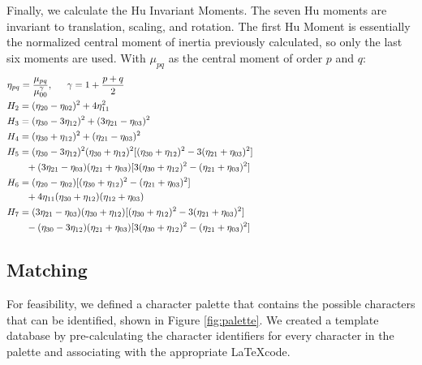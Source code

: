 \documentclass[journal]{IEEEtran}
\begin{document}
Finally, we calculate the Hu Invariant Moments\cite{Muralidharan:article_typical}. The seven Hu moments are invariant to translation, scaling, and rotation\cite{Hu:article_typical}. The first Hu Moment is essentially the normalized central moment of inertia previously calculated, so only the last six moments are used. With $\mu_{pq}$ as the central moment of order $p$ and $q$:
    \begin{equation} \label{eq:hu_moments}
    \begin{aligned}
    &\eta_{pq}=\frac{\mu_{pq}}{\mu_{00}^{\gamma}}, \hspace{15pt} \gamma=1+\frac{p+q}{2}\\
    & H_2=(\eta_{20}-\eta_{02})^2 +4\eta_{11}^2 \\    
    & H_3=(\eta_{30}-3\eta_{12})^2 +(3\eta_{21}-\eta_{03})^2 \\
    & H_4=(\eta_{30}+\eta_{12})^2 +(\eta_{21}-\eta_{03})^2 \\
    & H_5=(\eta_{30}-3\eta_{12})^2 (\eta_{30}+\eta_{12})^2[(\eta_{30}+\eta_{12})^2-3(\eta_{21}+\eta_{03})^2] \\
    & \text{\qquad}+(3\eta_{21}-\eta_{03})(\eta_{21}+\eta_{03})[3(\eta_{30}+\eta_{12})^2-(\eta_{21}+\eta_{03})^2] \\
    & H_6=(\eta_{20}-\eta_{02})[(\eta_{30}+\eta_{12})^2-(\eta_{21}+\eta_{03})^2] \\
    & \text{\qquad}+4\eta_{11}(\eta_{30}+\eta_{12})(\eta_{12}+\eta_{03}) \\
    & H_7=(3\eta_{21}-\eta_{03})(\eta_{30}+\eta_{12})[(\eta_{30}+\eta_{12})^2-3(\eta_{21}+\eta_{03})^2] \\
    & \text{\qquad}-(\eta_{30}-3\eta_{12})(\eta_{21}+\eta_{03})[3(\eta_{30}+\eta_{12})^2-(\eta_{21}+\eta_{03})^2]
    \end{aligned}
    \phantom{\hspace{6cm}}
    \end{equation}
\subsection{Matching}

For feasibility, we defined a character palette that contains the possible characters that can be identified, shown in Figure \ref{fig:palette}. We created a template database by pre-calculating the character identifiers for every character in the palette and associating with the appropriate \LaTeX code. 
\end{document}
